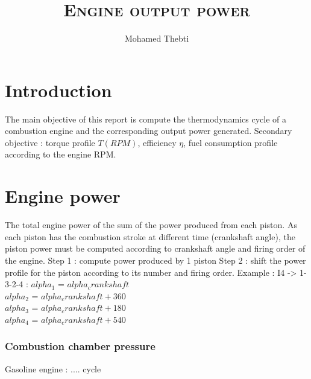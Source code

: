 \documentclass[12pt,a4paper]{article}
\title{
	\Huge\textsc{Engine output power}
}
\author{Mohamed Thebti}
\begin{document}
	\setlength{\parindent}{0mm}
	
	\fancyhead[R]{\slshape \leftmark}
	
	\fancyfoot[C]{}
	\fancyfoot[R]{\thepage}
	
	\maketitle
	\newpage
	
	\tableofcontents
	
	\newpage
	
	
	\section{Introduction}
	
	The main objective of this report is compute the thermodynamics cycle of a combustion engine and the corresponding output power generated. 
	Secondary objective : torque profile $T(RPM)$, efficiency $\eta$, fuel consumption profile according to the engine RPM.
	
	
	
	\section{Engine power}
	
	The total engine power of the sum of the power produced from each piston. 
	As each piston has the combustion stroke at different time (crankshaft angle), the piston power must be computed according to crankshaft angle and firing order of the engine. 
	Step 1 : compute power produced by 1 piston
	Step 2 : shift the power profile for the piston according to its number and firing order.
	Example : I4 -> 1-3-2-4 : 
	$alpha_1$ = $alpha_crankshaft$\\
	$alpha_2$ = $alpha_crankshaft + 360$\\
	$alpha_3$ = $alpha_crankshaft + 180$\\
	$alpha_4$ = $alpha_crankshaft + 540$\\
	\subsubsection{Combustion chamber pressure}
	Gasoline engine : .... cycle
	
\end{document}
